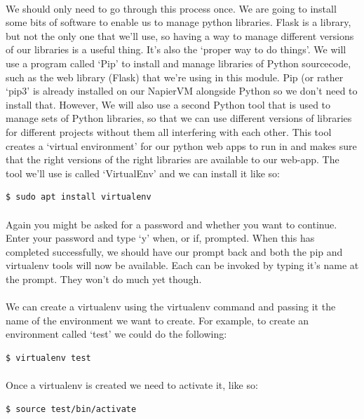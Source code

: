 \documentclass[12pt, a4paper, oneside]{book}
\begin{document}
\paragraph{} We should only need to go through this process once. We are going to install some bits of software to enable us to manage python libraries. Flask is a library, but not the only one that we'll use, so having a way to manage different versions of our libraries is a useful thing. It's also the `proper way to do things'. We will use a program called `Pip' to install and manage libraries of Python sourcecode, such as the web library (Flask) that we're using in this module. Pip (or rather `pip3' is already installed on our NapierVM alongside Python so we don't need to install that. However, We will also use a second Python tool that is used to manage sets of Python libraries, so that we can use different versions of libraries for different projects without them all interfering with each other. This tool creates a `virtual environment' for our python web apps to run in and makes sure that the right versions of the right libraries are available to our web-app. The tool we'll use is called `VirtualEnv' and we can install it like so:

\begin{lstlisting}[style=DOS]
    $ sudo apt install virtualenv
\end{lstlisting}

\paragraph{} Again you might be asked for a password and whether you want to continue. Enter your password and type `y' when, or if, prompted. When this has completed successfully, we should have our prompt back and both the pip and virtualenv tools will now be available. Each can be invoked by typing it's name at the prompt. They won't do much yet though. 

\paragraph{} We can create a virtualenv using the virtualenv command and passing it the name of the environment we want to create. For example, to create an environment called `test' we could do the following:
\begin{lstlisting}[style=DOS]
    $ virtualenv test
\end{lstlisting}

\paragraph{} Once a virtualenv is created we need to activate it, like so:
\begin{lstlisting}[style=DOS]
    $ source test/bin/activate
\end{lstlisting}
\end{document}
